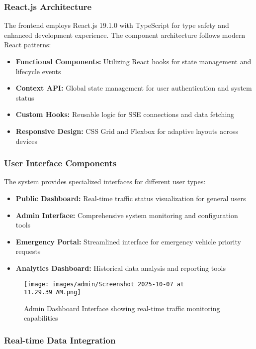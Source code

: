 \documentclass[conference]{IEEEtran}
\begin{document}
\subsubsection{React.js Architecture}

The frontend employs React.js 19.1.0 with TypeScript for type safety and enhanced development experience. The component architecture follows modern React patterns:

\begin{itemize}
\item \textbf{Functional Components:} Utilizing React hooks for state management and lifecycle events
\item \textbf{Context API:} Global state management for user authentication and system status
\item \textbf{Custom Hooks:} Reusable logic for SSE connections and data fetching
\item \textbf{Responsive Design:} CSS Grid and Flexbox for adaptive layouts across devices
\end{itemize}

\subsubsection{User Interface Components}

The system provides specialized interfaces for different user types:

\begin{itemize}
\item \textbf{Public Dashboard:} Real-time traffic status visualization for general users
\item \textbf{Admin Interface:} Comprehensive system monitoring and configuration tools
\item \textbf{Emergency Portal:} Streamlined interface for emergency vehicle priority requests
\item \textbf{Analytics Dashboard:} Historical data analysis and reporting tools
\end{itemize}

\begin{figure}[H]
\centering
\texttt{[image: images/admin/Screenshot 2025-10-07 at 11.29.39 AM.png]}
\caption{Admin Dashboard Interface showing real-time traffic monitoring capabilities}
\label{fig:admin_dashboard}
\end{figure}

\subsubsection{Real-time Data Integration}
\end{document}
